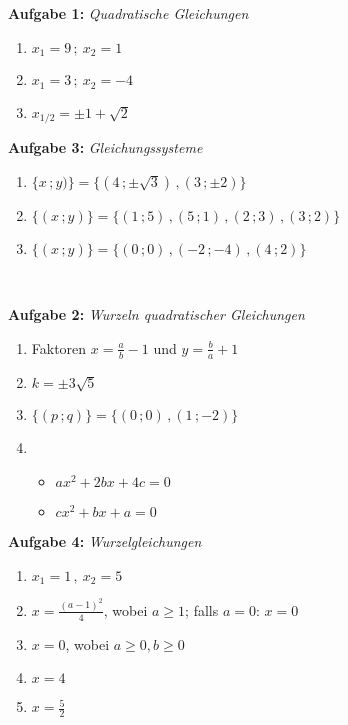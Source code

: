 
\begin{minipage}[t]{0.52\textwidth}
    \textbf{Aufgabe 1: } \emph{Quadratische Gleichungen}
    \begin{enumerate}[label=(\alph*)]
        \item $x_1=9\,;\ x_2=1$
        \item $x_1=3\,;\ x_2=-4$
        \item $x_{1/2}=\pm 1+\sqrt{2}$
    \end{enumerate}
\end{minipage}
\hfill
\begin{minipage}[t]{0.48\textwidth}
    \textbf{Aufgabe 3: } \emph{Gleichungssysteme}
    \begin{enumerate}[label=(\alph*)]
    \item $\{x\,;y)\}=\{(4\,;\pm\sqrt{3})\,,(3\,;\pm2)\}$
    \item $\{(x\,;y)\}=\{(1\,;5)\,,(5\,;1)\,,(2\,;3)\,,(3\,;2)\}$
    \item $\{(x\,;y)\}=\{(0\,;0)\,,(-2\,;-4)\,,(4\,;2)\}$
    \end{enumerate}
\end{minipage}
%
\\$~$\\[5mm]
%
\begin{minipage}[t]{0.52\textwidth}
    \textbf{Aufgabe 2: } \emph{Wurzeln quadratischer Gleichungen}
    \begin{enumerate}[label=(\alph*)]
    \item Faktoren $x=\frac{a}{b}-1$ und $y=\frac{b}{a}+1$
    \item $k=\pm3\sqrt{5}$
    \item $\{(p\,;q)\}=\{(0\,;0)\,,(1\,;-2)\}$
    \item 
    \begin{itemize}
    \item $ax^2+2bx+4c=0$
    \item $cx^2+bx+a=0$
    \end{itemize}
    \end{enumerate}
\end{minipage}
\hfill 
\begin{minipage}[t]{0.48\textwidth}
    \textbf{Aufgabe 4: } \emph{Wurzelgleichungen}
    \begin{enumerate}[label=(\alph*)]
    \item $x_1=1\,,\ x_2=5$
    \item $x=\frac{(a-1)^2}{4}$, wobei $a\ge 1$; falls $a=0$: $x=0$
    \item $x=0$, wobei $a\ge 0, b\ge 0$
    \item $x=4$
    \item $x=\frac{5}{2}$
    \end{enumerate}
\end{minipage}
